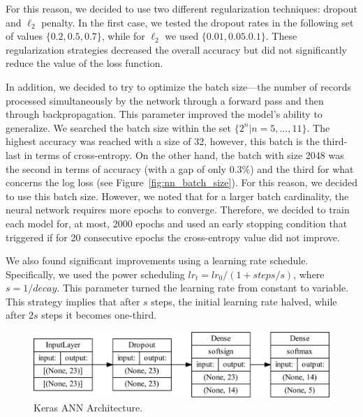 \documentclass[10pt, a4paper, twocolumn]{article}
\begin{document}
For this reason, we decided to use two different regularization techniques: dropout and $\ell_2$ penalty. In the first case, we tested the dropout rates in the following set of values $\{0.2, 0.5, 0.7\}$, while for  $\ell_2$ we used  $\{0.01, 0.05. 0.1\}$. These regularization strategies decreased the overall accuracy but did not significantly reduce the value of the loss function.

In addition, we decided to try to optimize the batch size---the number of records processed simultaneously by the network through a forward pass and then through backpropagation. This parameter improved the model's ability to generalize. We searched the batch size within the set $\{2^n|n=5,\dots,11\}$. The highest accuracy was reached with a size of 32, however, this batch is the third-last in terms of cross-entropy. On the other hand, the batch with size 2048 was the second in terms of accuracy (with a gap of only 0.3\%) and the third for what concerns the log loss (see Figure~\ref{fig:nn_batch_size}). For this reason, we decided to use this batch size. However, we noted that for a larger batch cardinality, the neural network requires more epochs to converge. Therefore, we decided to train each model for, at most, 2000 epochs and used an early stopping condition that triggered if for 20 consecutive epochs the cross-entropy value did not improve.

We also found significant improvements using a learning rate schedule. Specifically, we used the power scheduling $lr_t = lr_0 / (1 + steps / s)$, where $s=1/decay$. This parameter turned the learning rate from constant to variable. This strategy implies that after $s$ steps, the initial learning rate halved, while after $2s$ steps it becomes one-third. 

\begin{figure}
    \centering
    \includegraphics[width=\linewidth]{immagini simone/keras_ann_arch.pdf}
    \caption{Keras ANN Architecture.}
    \label{fig:keras_ann}
\end{figure}
\end{document}
